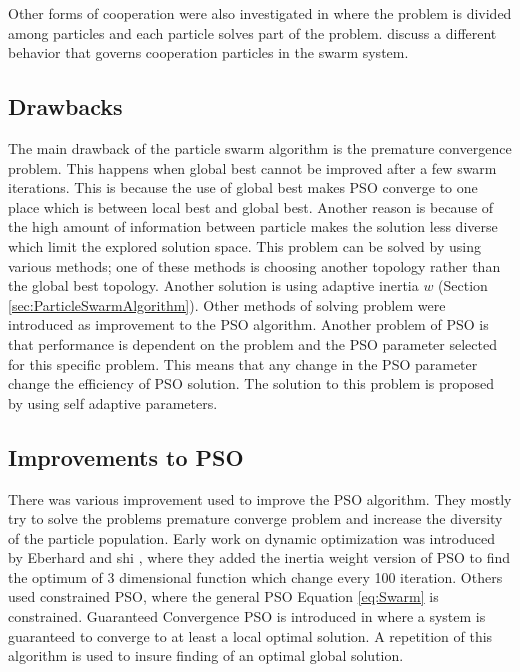  Other forms of cooperation were also investigated in \cite{facotrsSwarm} where the problem is divided among particles and each particle solves part of the problem. \cite{facotrsSwarm} discuss a different behavior that governs cooperation particles in the swarm system.  %
  

\subsection{Drawbacks}

The main drawback of the particle swarm algorithm is the premature convergence problem. This happens when global best cannot be improved after a few swarm iterations. This is because the use of global best makes PSO converge to one place which is between local best and global best.  Another reason is because of the high amount of information between particle makes the solution less diverse which limit the explored solution space. This problem can be solved by using various methods; one of these methods is choosing another topology rather than the global best topology.  Another solution is using adaptive inertia $w$ (Section \ref{sec:ParticleSwarmAlgorithm}). Other methods of solving problem were introduced as improvement to the PSO algorithm. Another problem of PSO is that performance is dependent on the problem and the PSO parameter selected for this specific problem. This means that any change in the PSO parameter change the efficiency of PSO solution. The solution to this problem is proposed by using self adaptive parameters. 
 
 
\subsection{Improvements to PSO}

There was various improvement used to improve the PSO algorithm. They mostly try to solve the problems premature converge problem and increase the diversity of the particle population. Early work on dynamic optimization was introduced by Eberhard and shi \cite{paramterSelection}, where they added the inertia weight version of PSO to find the optimum of 3 dimensional function which change every 100 iteration. Others used constrained PSO, where the general PSO Equation \ref{eq:Swarm} is constrained. Guaranteed Convergence PSO is introduced in \cite{GCPSO} where a system is guaranteed to converge to at least a local optimal solution. A repetition of this algorithm is used to insure finding of an optimal global solution. 

